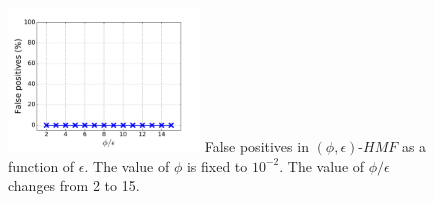 
\begin{figure}[t!]
\begin{center}
\includegraphics[width=2.0in]{figure/fp}
{False positives in $(\phi, \epsilon)\mbox{-}HMF$ as a function of $\epsilon$. The value of $\phi$ is fixed to $10^{-2}$.
The value of $\phi/\epsilon$ changes from 2 to 15.}
\end{center}
\vspace{-0.1in}
\end{figure}